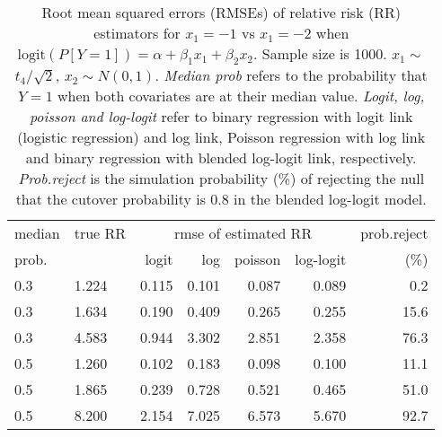 \documentclass[12pt,a4paper]{article}
\begin{document}
\begin{table}[H] 
\small\sf\centering 
\caption{Root mean squared errors (RMSEs) of relative risk (RR) estimators for $x_1=-1$ vs $x_1=-2$ when $\mbox{logit}(P[Y=1])=\alpha+\beta_1 x_1 + \beta_2 x_2$. Sample size is 1000. $x_1 \sim $$t_4/\sqrt{2}$, $x_2 \sim N(0,1)$. {\it Median prob} refers to the probability that $Y=1$ when both covariates are at their median value. {\it Logit, log, poisson and log-logit} refer to binary regression with logit link (logistic regression) and log link, Poisson regression with log link and binary regression with blended log-logit link, respectively. {\it Prob.reject} is the simulation probability (\%) of rejecting the null that the cutover probability is $0.8$ in the blended log-logit model.} 
\begin{tabular}{llrrrrr} 
\toprule 
median & true RR & \multicolumn{4}{c}{rmse of estimated RR} & prob.reject \\ 
prob. & & logit & log & poisson & log-logit  & (\%) \\ \midrule 
0.3 & 1.224 & 0.115 & 0.101 & 0.087 & 0.089 &  0.2 \\  
0.3 & 1.634 & 0.190 & 0.409 & 0.265 & 0.255 & 15.6 \\  
0.3 & 4.583 & 0.944 & 3.302 & 2.851 & 2.358 & 76.3 \\  
0.5 & 1.260 & 0.102 & 0.183 & 0.098 & 0.100 & 11.1 \\  
0.5 & 1.865 & 0.239 & 0.728 & 0.521 & 0.465 & 51.0 \\  
0.5 & 8.200 & 2.154 & 7.025 & 6.573 & 5.670 & 92.7 \\  
\bottomrule 
\end{tabular} 
\end{table} 
\end{document}
